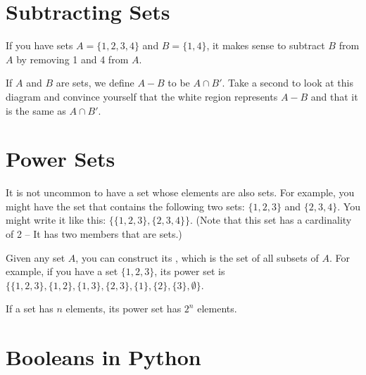 
\section{Subtracting Sets}

If you have sets $A = \{1,2,3,4\}$ and $B = \{1, 4\}$, it makes sense
to subtract $B$ from $A$ by removing 1 and 4 from $A$.

If $A$ and $B$ are sets, we define $A - B$ to be $A \cap B'$.  Take a
second to look at this diagram and convince yourself that the white
region represents $A - B$ and that it is the same as $A \cap B'$.


\section{Power Sets}

It is not uncommon to have a set whose elements are also sets.  For
example, you might have the set that contains the following two sets:
$\{1,2,3\}$ and $\{2,3,4\}$. You might write it like this: $\{
\{1,2,3\}, \{2,3,4\} \}$. (Note that this set has a cardinality of 2
-- It has two members that are sets.)

Given any set $A$, you can construct its , which is
the set of all subsets of $A$.  For example, if you have a set
$\{1,2,3\}$, its power set is $\{\{1,2,3\}, \{1,2\},\{1,3\}, \{2,3\},
\{1\}, \{2\}, \{3\}, \emptyset\}$.

If a set has $n$ elements, its power set has $2^n$ elements.

\section{Booleans in Python}

